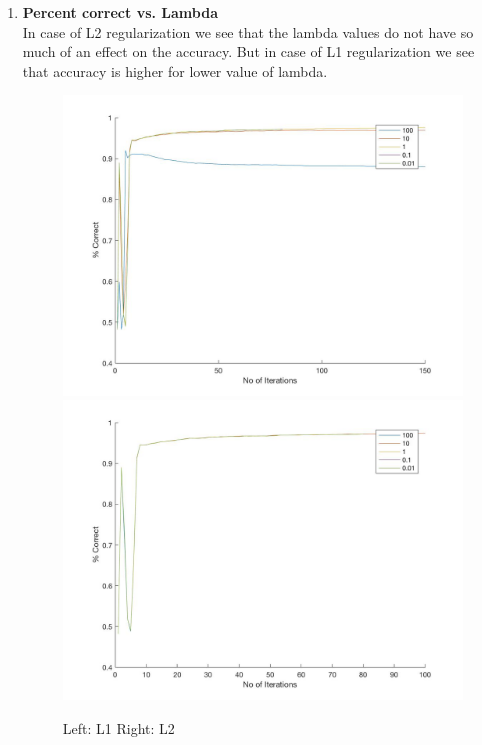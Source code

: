 \documentclass[11pt,twoside]{article}
\begin{document}
\begin{enumerate}[label=(\alph*)]

\item \textbf{Percent correct vs. Lambda}\\
In case of L2 regularization we see that the lambda values do not have so much of an effect on the accuracy. But in case of L1 regularization we see that accuracy is higher for lower value of lambda.
\begin{figure}[H]
  \includegraphics[width=0.45\columnwidth]{5b_l1}
  \includegraphics[width=0.45\columnwidth]{5b_l2}
  \centering
  \caption{Left: L1 Right: L2}
  \label{fig:5_b}
  \end{figure}
  

\end{enumerate}
\end{document}
